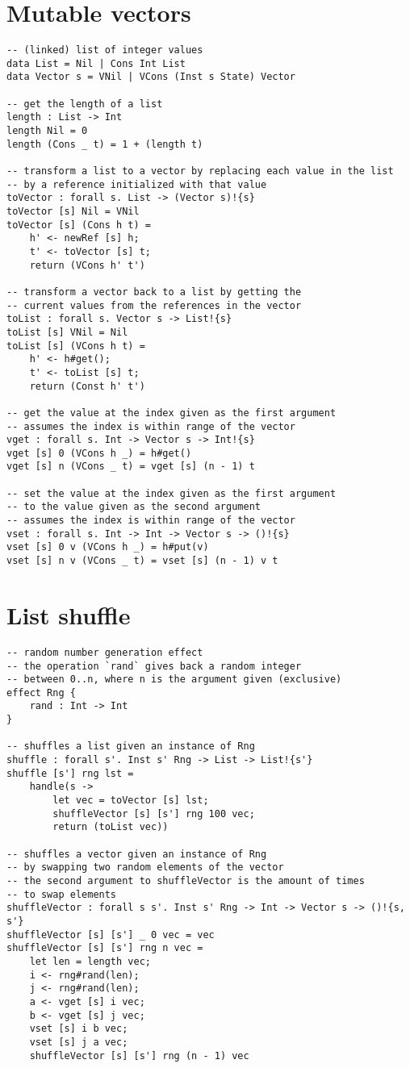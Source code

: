 \section{Mutable vectors}
\begin{verbatim}
-- (linked) list of integer values
data List = Nil | Cons Int List
data Vector s = VNil | VCons (Inst s State) Vector

-- get the length of a list
length : List -> Int
length Nil = 0
length (Cons _ t) = 1 + (length t)

-- transform a list to a vector by replacing each value in the list
-- by a reference initialized with that value
toVector : forall s. List -> (Vector s)!{s}
toVector [s] Nil = VNil
toVector [s] (Cons h t) =
	h' <- newRef [s] h;
	t' <- toVector [s] t;
	return (VCons h' t')

-- transform a vector back to a list by getting the
-- current values from the references in the vector
toList : forall s. Vector s -> List!{s}
toList [s] VNil = Nil
toList [s] (VCons h t) =
	h' <- h#get();
	t' <- toList [s] t;
	return (Const h' t')

-- get the value at the index given as the first argument
-- assumes the index is within range of the vector
vget : forall s. Int -> Vector s -> Int!{s}
vget [s] 0 (VCons h _) = h#get()
vget [s] n (VCons _ t) = vget [s] (n - 1) t

-- set the value at the index given as the first argument
-- to the value given as the second argument
-- assumes the index is within range of the vector
vset : forall s. Int -> Int -> Vector s -> ()!{s}
vset [s] 0 v (VCons h _) = h#put(v)
vset [s] n v (VCons _ t) = vset [s] (n - 1) v t
\end{verbatim}

\section{List shuffle}
\begin{verbatim}
-- random number generation effect
-- the operation `rand` gives back a random integer
-- between 0..n, where n is the argument given (exclusive)
effect Rng {
	rand : Int -> Int
}

-- shuffles a list given an instance of Rng
shuffle : forall s'. Inst s' Rng -> List -> List!{s'}
shuffle [s'] rng lst =
	handle(s ->
		let vec = toVector [s] lst;
		shuffleVector [s] [s'] rng 100 vec;
		return (toList vec))

-- shuffles a vector given an instance of Rng
-- by swapping two random elements of the vector
-- the second argument to shuffleVector is the amount of times
-- to swap elements
shuffleVector : forall s s'. Inst s' Rng -> Int -> Vector s -> ()!{s, s'}
shuffleVector [s] [s'] _ 0 vec = vec
shuffleVector [s] [s'] rng n vec =
	let len = length vec;
	i <- rng#rand(len);
	j <- rng#rand(len);
	a <- vget [s] i vec;
	b <- vget [s] j vec;
	vset [s] i b vec;
	vset [s] j a vec;
	shuffleVector [s] [s'] rng (n - 1) vec
\end{verbatim}

